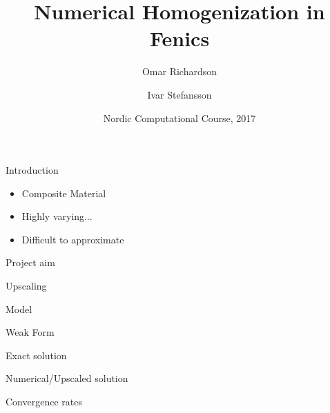 \documentclass{beamer}
\title[Numerical homogenization]{Numerical Homogenization in Fenics}
\author[O. Richardson \and I. Stefansson] %
{Omar Richardson \and Ivar Stefansson}
\institute %
{
    Karlstad University, Sweden \and University of Bergen, Norway
}
\date[]{Nordic Computational Course, 2017}
\begin{document}
  \frame{\titlepage}
\begin{frame}{Introduction}
  \begin{itemize}
    \item Composite Material
    \item Highly varying...
    \item Difficult to approximate
  \end{itemize}
\end{frame}

\begin{frame}[t]{Project aim}

\end{frame}

\begin{frame}[t]{Upscaling}

\end{frame}

\begin{frame}[t]{Model}

\end{frame}

\begin{frame}[t]{Weak Form}

\end{frame}

\begin{frame}[t]{Exact solution}

\end{frame}

\begin{frame}[t]{Numerical/Upscaled solution}

\end{frame}

\begin{frame}[t]{Convergence rates}

\end{frame}
\end{document}
